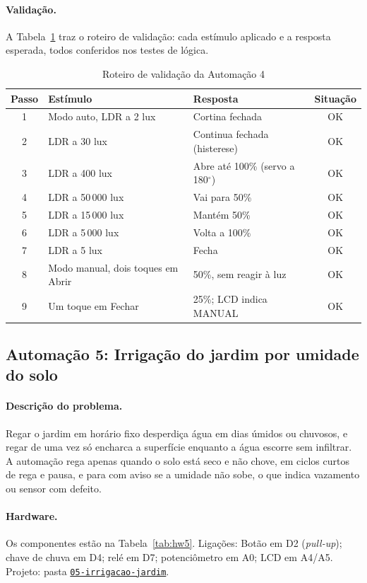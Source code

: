 \documentclass[12pt]{article}
\newcommand{\repositorio}{https://github.com/USUARIO/REPOSITORIO}
\newcommand{\pasta}[1]{\href{\repositorio/tree/main/#1}{\texttt{#1}}}
\begin{document}
\paragraph{Validação.} A Tabela~\ref{tab:val4} traz o roteiro de validação: cada estímulo aplicado e a resposta esperada, todos conferidos nos testes de lógica.

\begin{table}[ht]
\centering
\caption{Roteiro de validação da Automação 4}\label{tab:val4}
\footnotesize
\begin{tabularx}{\textwidth}{cXXc}
\toprule
Passo & Estímulo & Resposta & Situação \\
\midrule
1 & Modo auto, LDR a 2 lux & Cortina fechada & OK \\
2 & LDR a 30 lux & Continua fechada (histerese) & OK \\
3 & LDR a 400 lux & Abre até 100\% (servo a 180$^\circ$) & OK \\
4 & LDR a 50\,000 lux & Vai para 50\% & OK \\
5 & LDR a 15\,000 lux & Mantém 50\% & OK \\
6 & LDR a 5\,000 lux & Volta a 100\% & OK \\
7 & LDR a 5 lux & Fecha & OK \\
8 & Modo manual, dois toques em Abrir & 50\%, sem reagir à luz & OK \\
9 & Um toque em Fechar & 25\%; LCD indica MANUAL & OK \\
\bottomrule
\end{tabularx}
\end{table}

\subsection{Automação 5: Irrigação do jardim por umidade do solo}\label{sub:a5}

\paragraph{Descrição do problema.} Regar o jardim em horário fixo desperdiça água em dias úmidos ou chuvosos, e regar de uma vez só encharca a superfície enquanto a água escorre sem infiltrar. A automação rega apenas quando o solo está seco e não chove, em ciclos curtos de rega e pausa, e para com aviso se a umidade não sobe, o que indica vazamento ou sensor com defeito.

\paragraph{Hardware.} Os componentes estão na Tabela~\ref{tab:hw5}. Ligações: Botão em D2 (\emph{pull-up}); chave de chuva em D4; relé em D7; potenciômetro em A0; LCD em A4/A5. Projeto: pasta \pasta{05-irrigacao-jardim}.
\end{document}
